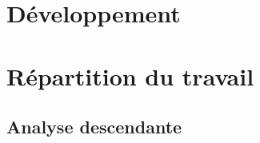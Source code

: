 \documentclass[11pt]{report}
\begin{document}
\part{Développement}



\setcounter{chapter}{0}
\part{Répartition du travail}

\chapter{Analyse descendante}
\begin{table}[h]
\begin{center}
\begin{tabular}{|l|c|c|c|c|c|}
	

\end{tabular}
\end{center}
\end{table}
\end{document}
